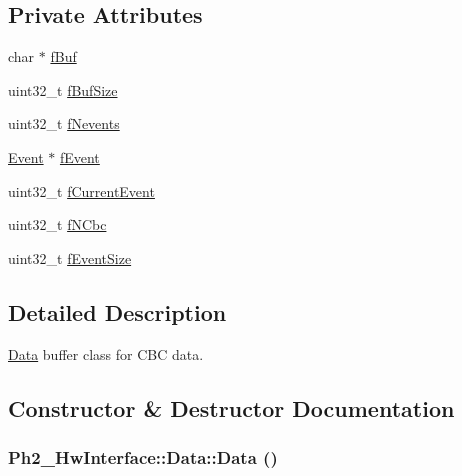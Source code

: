 \subsection*{Private Attributes}
\begin{CompactItemize}
\item 
char $\ast$ \hyperlink{class_ph2___hw_interface_1_1_data_cf647e64b2febe8555e7b044e5cfc98d}{f\-Buf}
\item 
uint32\_\-t \hyperlink{class_ph2___hw_interface_1_1_data_af97e7ef5081a4a6a412c25382b3bafe}{f\-Buf\-Size}
\item 
uint32\_\-t \hyperlink{class_ph2___hw_interface_1_1_data_c27abb30ceb327ce0fc4245caaf0b3d5}{f\-Nevents}
\item 
\hyperlink{class_ph2___hw_interface_1_1_event}{Event} $\ast$ \hyperlink{class_ph2___hw_interface_1_1_data_255954fc9bd7fc6262b863eb8f044048}{f\-Event}
\item 
uint32\_\-t \hyperlink{class_ph2___hw_interface_1_1_data_4566e332acab8fe25be41f05c2862222}{f\-Current\-Event}
\item 
uint32\_\-t \hyperlink{class_ph2___hw_interface_1_1_data_ad1da032576bebc3351e8b900bbfddca}{f\-NCbc}
\item 
uint32\_\-t \hyperlink{class_ph2___hw_interface_1_1_data_3026264d11102e6c31d171d232af9de7}{f\-Event\-Size}
\end{CompactItemize}


\subsection{Detailed Description}
\hyperlink{class_ph2___hw_interface_1_1_data}{Data} buffer class for CBC data. 



\subsection{Constructor \& Destructor Documentation}
\hypertarget{class_ph2___hw_interface_1_1_data_72e6b3c8af444dd82569d3a47f89812c}{
\subsubsection[Data]{\setlength{\rightskip}{0pt plus 5cm}Ph2\_\-Hw\-Interface::Data::Data ()}}
\label{class_ph2___hw_interface_1_1_data_72e6b3c8af444dd82569d3a47f89812c}



